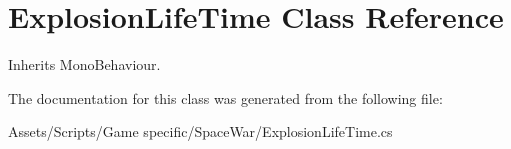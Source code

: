 \hypertarget{class_explosion_life_time}{\section{Explosion\-Life\-Time Class Reference}
\label{class_explosion_life_time}
}


Inherits Mono\-Behaviour.



The documentation for this class was generated from the following file\-:\begin{DoxyCompactItemize}
\item 
Assets/\-Scripts/\-Game specific/\-Space\-War/Explosion\-Life\-Time.\-cs\end{DoxyCompactItemize}
